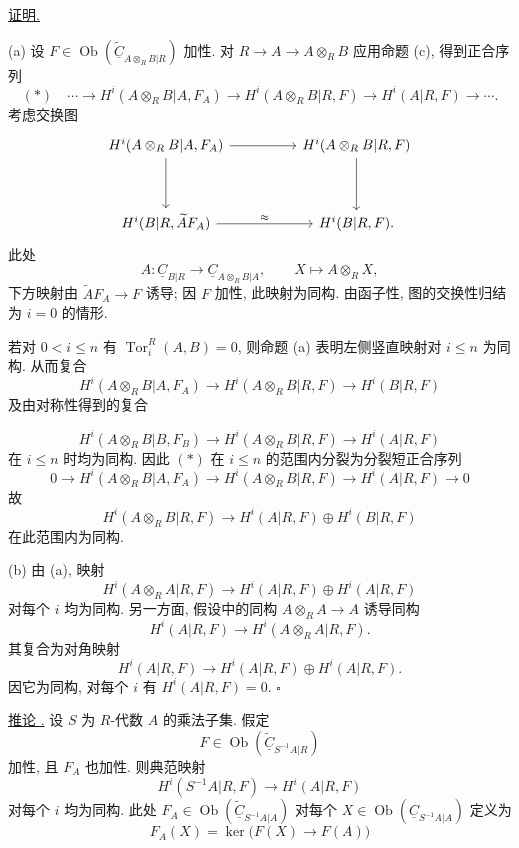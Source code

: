 \underline{证明.}

(a) 设 $F\in\operatorname{Ob}(\widetilde{\underline C}_{A\otimes_RB|R})$ 加性.
对 $R\longrightarrow A\longrightarrow A\otimes_RB$ 应用命题
(c), 得到正合序列
\[
 (*)\quad\cdots\longrightarrow
 H^i(A\otimes_RB|A,F_A)
 \longrightarrow H^i(A\otimes_RB|R,F)
 \longrightarrow H^i(A|R,F)\longrightarrow\cdots.
\]
考虑交换图
\[
\begin{tikzcd}[column sep=huge,row sep=huge]
H^i(A\otimes_RB|A,F_A) \arrow[r] \arrow[d]
& H^i(A\otimes_RB|R,F) \arrow[d]\\
H^i(B|R,\widetilde A F_A) \arrow[r,"\approx"]
& H^i(B|R,F).
\end{tikzcd}
\]
此处
\[
 A:\underline C_{B|R}\longrightarrow
 \underline C_{A\otimes_RB|A},
 \qquad X\longmapsto A\otimes_RX,
\]
下方映射由 $\widetilde A F_A\longrightarrow F$ 诱导;
因 $F$ 加性, 此映射为同构.
由函子性, 图的交换性归结为 $i=0$ 的情形.

若对 $0<i\leq n$ 有 $\operatorname{Tor}_i^R(A,B)=0$,
则命题 (a)
表明左侧竖直映射对 $i\leq n$ 为同构. 从而复合
\[
 H^i(A\otimes_RB|A,F_A)
 \longrightarrow H^i(A\otimes_RB|R,F)
 \longrightarrow H^i(B|R,F)
\]
及由对称性得到的复合


\[
 H^i(A\otimes_RB|B,F_B)
 \longrightarrow H^i(A\otimes_RB|R,F)
 \longrightarrow H^i(A|R,F)
\]
在 $i\leq n$ 时均为同构.
因此 $(*)$ 在 $i\leq n$ 的范围内分裂为分裂短正合序列
\[
 0\longrightarrow H^i(A\otimes_RB|A,F_A)
 \longrightarrow H^i(A\otimes_RB|R,F)
 \longrightarrow H^i(A|R,F)\longrightarrow0
\]
故
\[
 H^i(A\otimes_RB|R,F)
 \longrightarrow H^i(A|R,F)\oplus H^i(B|R,F)
\]
在此范围内为同构.

(b) 由 (a), 映射
\[
 H^i(A\otimes_RA|R,F)
 \longrightarrow H^i(A|R,F)\oplus H^i(A|R,F)
\]
对每个 $i$ 均为同构.
另一方面, 假设中的同构 $A\otimes_RA\longrightarrow A$ 诱导同构
\[
 H^i(A|R,F)\longrightarrow H^i(A\otimes_RA|R,F).
\]
其复合为对角映射
\[
 H^i(A|R,F)\longrightarrow
 H^i(A|R,F)\oplus H^i(A|R,F).
\]
因它为同构, 对每个 $i$ 有 $H^i(A|R,F)=0$. \hfill$\square$

\underline{推论 .}
设 $S$ 为 $R$-代数 $A$ 的乘法子集. 假定
\[
 F\in\operatorname{Ob}
 (\widetilde{\underline C}_{S^{-1}A|R})
\]
加性, 且 $F_A$ 也加性. 则典范映射
\[
 H^i(S^{-1}A|R,F)\longrightarrow H^i(A|R,F)
\]
对每个 $i$ 均为同构.
此处 $F_A\in\operatorname{Ob}(\widetilde{\underline C}_{S^{-1}A|A})$
对每个 $X\in\operatorname{Ob}(\underline C_{S^{-1}A|A})$ 定义为
\[
 F_A(X)=\ker\bigl(F(X)\longrightarrow F(A)\bigr)
\]

